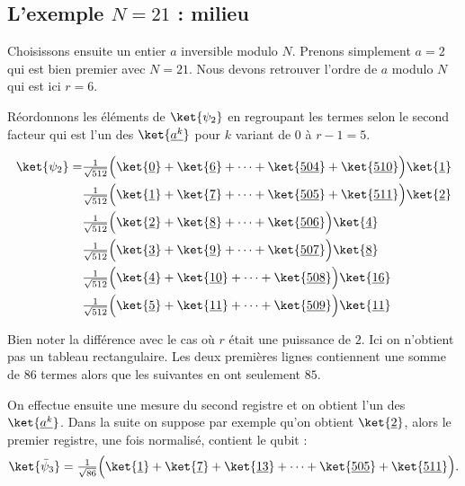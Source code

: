 \documentclass[11pt,class=report,crop=false]{standalone}
\begin{document}
\subsection{L'exemple $N=21$ : milieu}

Choisissons ensuite un entier $a$ inversible modulo $N$.
Prenons simplement $a=2$ qui est bien premier avec $N=21$.
Nous devons retrouver l'ordre de $a$ modulo $N$ qui est ici $r=6$.

Réordonnons les éléments de $\ket{\psi_2}$ en regroupant les termes selon le second facteur qui est l'un des $\ket{\underline {a^k}}$ pour $k$ variant de $0$ à $r-1=5$.

\begin{align*}
\ket{\psi_2} = 
& \tfrac{1}{\sqrt{512}} \Big( \ket{\underline{0}} + \ket{\underline{6}} + \cdots + \ket{\underline{504}} + \ket{\underline{510}} \Big)  \ket{\underline 1} \\
& \tfrac{1}{\sqrt{512}} \Big( \ket{\underline{1}} + \ket{\underline{7}} + \cdots + \ket{\underline{505}} + \ket{\underline{511}} \Big)  \ket{\underline 2} \\
& \tfrac{1}{\sqrt{512}} \Big( \ket{\underline{2}} + \ket{\underline{8}} + \cdots + \ket{\underline{506}} \Big)  \ket{\underline 4} \\
& \tfrac{1}{\sqrt{512}} \Big( \ket{\underline{3}} + \ket{\underline{9}} + \cdots + \ket{\underline{507}} \Big)  \ket{\underline 8} \\
& \tfrac{1}{\sqrt{512}} \Big( \ket{\underline{4}} + \ket{\underline{10}} + \cdots + \ket{\underline{508}} \Big)  \ket{\underline{16}} \\
& \tfrac{1}{\sqrt{512}} \Big( \ket{\underline{5}} + \ket{\underline{11}} + \cdots + \ket{\underline{509}} \Big)  \ket{\underline{11}} \\
\end{align*}

Bien noter la différence avec le cas où $r$ était une puissance de $2$. Ici on n'obtient pas un tableau rectangulaire. Les deux premières lignes contiennent une somme de $86$ termes alors que les suivantes en ont seulement $85$.

On effectue ensuite une mesure du second registre et on obtient l'un des $\ket{\underline {a^k}}$. Dans la suite on suppose par exemple qu'on obtient $\ket{\underline 2}$, alors le premier registre, une fois normalisé, contient le qubit :
$$\ket{\bar \psi_3} = \tfrac{1}{\sqrt{86}} \Big( \ket{\underline{1}} + \ket{\underline{7}} + \ket{\underline{13}} +\cdots + \ket{\underline{505}} + \ket{\underline{511}} \Big).$$
\end{document}
